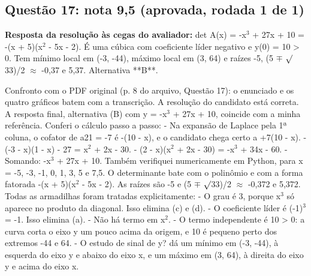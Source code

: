\documentclass{article}%
\begin{document}
\subsection*{Questão 17: nota 9,5 (aprovada, rodada 1 de 1)}%
\textbf{Resposta da resolução às cegas do avaliador:} det A(x) = -x$^3$ + 27x + 10 = -(x + 5)(x$^2$ - 5x - 2). É uma cúbica com coeficiente líder negativo e y(0) = 10 > 0. Tem mínimo local em (-3, -44), máximo local em (3, 64) e raízes -5, (5 $\mp$ $\surd$33)/2 $\approx$ -0,37 e 5,37. Alternativa **B**.\par %
Confronto com o PDF original (p. 8 do arquivo, Questão 17): o enunciado e os quatro gráficos batem com a transcrição.\newline%
\newline%
A resolução do candidato está correta. A resposta final, alternativa (B) com y = -x$^3$ + 27x + 10, coincide com a minha referência.\newline%
\newline%
Conferi o cálculo passo a passo:\newline%
{-} Na expansão de Laplace pela 1ª coluna, o cofator de a21 = -7 é -(10 - x), e o candidato chega certo a +7(10 - x).\newline%
{-} (-3 - x)(1 - x) - 27 = x$^2$ + 2x - 30.\newline%
{-} (2 - x)(x$^2$ + 2x - 30) = -x$^3$ + 34x - 60.\newline%
{-} Somando: -x$^3$ + 27x + 10.\newline%
\newline%
Também verifiquei numericamente em Python, para x = -5, -3, -1, 0, 1, 3, 5 e 7,5. O determinante bate com o polinômio e com a forma fatorada -(x + 5)(x$^2$ - 5x - 2). As raízes são -5 e (5 $\mp$ $\surd$33)/2 $\approx$ -0,372 e 5,372.\newline%
\newline%
Todas as armadilhas foram tratadas explicitamente:\newline%
{-} O grau é 3, porque x$^3$ só aparece no produto da diagonal. Isso elimina (c) e (d).\newline%
{-} O coeficiente líder é (-1)$^3$ = -1. Isso elimina (a).\newline%
{-} Não há termo em x$^2$.\newline%
{-} O termo independente é 10 > 0: a curva corta o eixo y um pouco acima da origem, e 10 é pequeno perto dos extremos -44 e 64.\newline%
{-} O estudo de sinal de y? dá um mínimo em (-3, -44), à esquerda do eixo y e abaixo do eixo x, e um máximo em (3, 64), à direita do eixo y e acima do eixo x.\newline%
\end{document}
